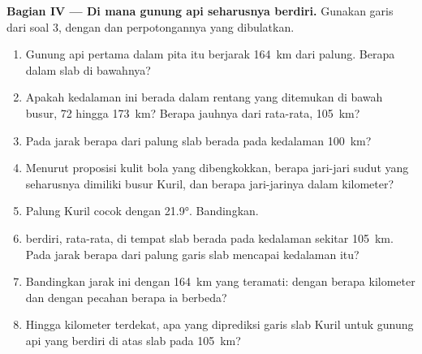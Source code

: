 \begin{problem}
\medskip
\noindent\textbf{Bagian IV --- Di mana gunung api seharusnya berdiri.} Gunakan garis dari soal 3,
dengan  dan perpotongannya yang dibulatkan.
\begin{enumerate}[resume]
  \item Gunung api pertama dalam pita itu berjarak \qty{164}{km} dari palung. Berapa dalam slab di
        bawahnya?
  \item Apakah kedalaman ini berada dalam rentang yang ditemukan di bawah busur, 72 hingga
        \qty{173}{km}? Berapa jauhnya dari rata-rata, \qty{105}{km}?
  \item Pada jarak berapa dari palung slab berada pada kedalaman \qty{100}{km}?
  \item Menurut proposisi kulit bola yang dibengkokkan, berapa jari-jari sudut yang seharusnya
        dimiliki busur Kuril, dan berapa jari-jarinya dalam kilometer?
  \item Palung Kuril cocok dengan  \ang{21.9}. Bandingkan.
  \item {} berdiri, rata-rata, di tempat slab berada pada kedalaman sekitar
        \qty{105}{km}. Pada jarak berapa dari palung garis slab mencapai kedalaman itu?
  \item Bandingkan jarak ini dengan \qty{164}{km} yang teramati: dengan berapa kilometer dan
        dengan pecahan berapa ia berbeda?
  \item Hingga kilometer terdekat,  apa yang diprediksi garis slab Kuril untuk
        gunung api yang berdiri di atas slab pada \qty{105}{km}?
\end{enumerate}
\end{problem}
